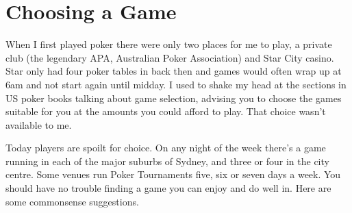 \chapter{Choosing a Game}


When I first played poker there were only two places for me to
play, a private club (the legendary APA, Australian Poker Association)
and Star City casino. Star only had four poker tables in
back then and games would often wrap up at 6am and not start again
until midday. I used to shake my head at the sections in US poker
books talking about game selection, advising you to choose the games
suitable for you at the amounts you could afford to play. That choice
wasn't available to me.

Today players are spoilt for choice. On any night
of the week there's a game running in each of
the major suburbs of Sydney, and three or four in
the city centre. Some venues run Poker Tournaments five, six or seven
days a week. You should have no trouble finding a game
you can enjoy and do well in. Here are some commonsense
suggestions.

